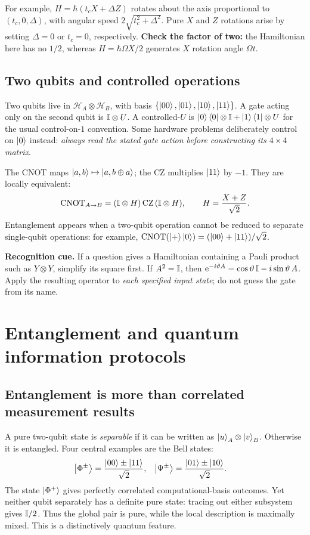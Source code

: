 For example, $H=\hbar( t_c X+\Delta Z)$ rotates about the axis proportional to $(t_c,0,\Delta)$, with angular speed $2\sqrt{t_c^2+\Delta^2}$. Pure $X$ and $Z$ rotations arise by setting $\Delta=0$ or $t_c=0$, respectively. \textbf{Check the factor of two:} the Hamiltonian here has no $1/2$, whereas $H=\hbar\Omega X/2$ generates $X$ rotation angle $\Omega t$.

\subsection{Two qubits and controlled operations}
Two qubits live in $\mathcal H_A\otimes\mathcal H_B$, with basis $\{\left\lvert 00\right\rangle,\left\lvert 01\right\rangle,\left\lvert 10\right\rangle,\left\lvert 11\right\rangle\}$. A gate acting only on the second qubit is $\mathbb{I}\otimes U$. A controlled-$U$ is $\left\lvert 0\right\rangle\left\langle 0\right\rvert\otimes\mathbb{I}+\left\lvert 1\right\rangle\left\langle 1\right\rvert\otimes U$ for the usual control-on-$1$ convention. Some hardware problems deliberately control on $\left\lvert 0\right\rangle$ instead: \emph{always read the stated gate action before constructing its $4\times4$ matrix}.

The CNOT maps $\left\lvert a,b\right\rangle\mapsto\left\lvert a,b\oplus a\right\rangle$; the CZ multiplies $\left\lvert 11\right\rangle$ by $-1$. They are locally equivalent:
\begin{equation}\label{eq:cnotcz}
\mathrm{CNOT}_{A\to B}=(\mathbb{I}\otimes H)\,\mathrm{CZ}\,(\mathbb{I}\otimes H),\qquad H=\frac{X+Z}{\sqrt2}.
\end{equation}
Entanglement appears when a two-qubit operation cannot be reduced to separate single-qubit operations: for example, $\mathrm{CNOT}(\left\lvert +\right\rangle\left\lvert 0\right\rangle)=(\left\lvert 00\right\rangle+\left\lvert 11\right\rangle)/\sqrt2$.

\begin{examtip}
\textbf{Recognition cue.} If a question gives a Hamiltonian containing a Pauli product such as $Y\otimes Y$, simplify its square first. If $A^2=\mathbb{I}$, then $\mathrm{e}^{-i\vartheta A}=\cos\vartheta\,\mathbb{I}-i\sin\vartheta\,A$. Apply the resulting operator to \emph{each specified input state}; do not guess the gate from its name.
\end{examtip}

\section{Entanglement and quantum information protocols}\label{sec:entanglement}
\subsection{Entanglement is more than correlated measurement results}
A pure two-qubit state is \emph{separable} if it can be written as $\left\lvert u\right\rangle_A\otimes\left\lvert v\right\rangle_B$. Otherwise it is entangled. Four central examples are the Bell states:
\begin{align}\label{eq:bellstates}
\left\lvert \Phi^\pm\right\rangle&=\frac{\left\lvert 00\right\rangle\pm\left\lvert 11\right\rangle}{\sqrt2},&
\left\lvert \Psi^\pm\right\rangle&=\frac{\left\lvert 01\right\rangle\pm\left\lvert 10\right\rangle}{\sqrt2}.
\end{align}
The state $\left\lvert \Phi^+\right\rangle$ gives perfectly correlated computational-basis outcomes. Yet neither qubit separately has a definite pure state: tracing out either subsystem gives $\mathbb{I}/2$. Thus the global pair is pure, while the local description is maximally mixed. This is a distinctively quantum feature.

